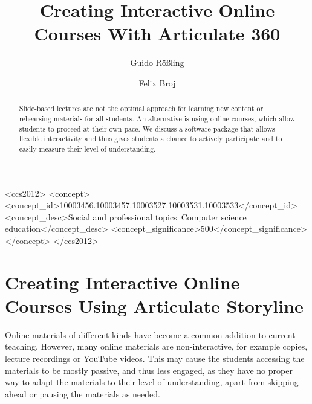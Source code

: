 \documentclass[sigconf]{acmart}
\begin{document}

\title{Creating Interactive Online Courses With Articulate 360}

\author{Guido R\"o\ss{}ling}
\author{Felix Broj}
\begin{CCSXML}
<ccs2012>
<concept>
<concept_id>10003456.10003457.10003527.10003531.10003533</concept_id>
<concept_desc>Social and professional topics~Computer science education</concept_desc>
<concept_significance>500</concept_significance>
</concept>
</ccs2012>
\end{CCSXML}


\begin{abstract}
Slide-based lectures are not the optimal approach for learning new content or rehearsing materials for
all students. An alternative is using online courses, which allow students to proceed at their own pace.
We discuss a software package that allows flexible interactivity and thus gives students a chance to
actively participate and to easily measure their level of understanding. 
\end{abstract}

\maketitle

\section{Creating Interactive Online Courses Using Articulate Storyline}

Online materials of different kinds have become a common addition to current teaching. However, many
online materials are non-interactive, for example copies, lecture recordings or YouTube
videos. This may cause the students accessing the materials to be mostly passive, and thus less
engaged, as they have no proper way to adapt the materials to their level of understanding,
apart from skipping ahead or pausing the materials as needed.
\end{document}
